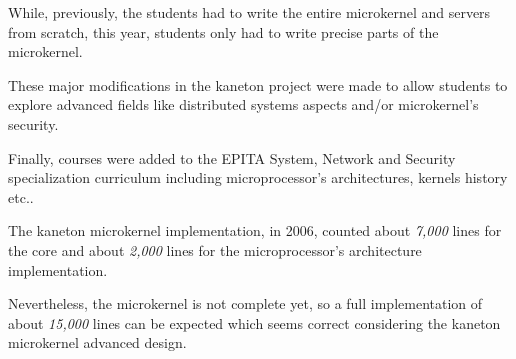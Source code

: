 While, previously, the students had to write the entire microkernel
and servers from scratch, this year, students only had to write precise
parts of the microkernel.

These major modifications in the kaneton project were made to
allow students to explore advanced fields like distributed systems
aspects and/or microkernel's security.

Finally, courses were added to the EPITA System, Network and Security
specialization curriculum including microprocessor's architectures,
kernels history etc..

The kaneton microkernel implementation, in 2006, counted about
\textit{7,000} lines for the core and about \textit{2,000} lines for the
microprocessor's architecture implementation.

Nevertheless, the microkernel is not complete yet, so a full implementation
of about \textit{15,000} lines can be expected which seems correct
considering the kaneton microkernel advanced design.
